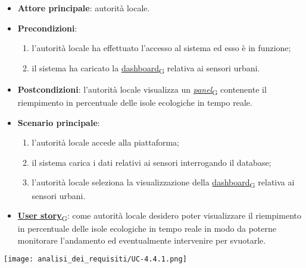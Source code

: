 \begin{itemize}
	\item \textbf{Attore principale}: autorità locale.
	\item \textbf{Precondizioni}:
	      \begin{enumerate}
		      \item l'autorità locale ha effettuato l'accesso al sistema ed esso è in funzione;
		      \item il sistema ha caricato la \href{https://7last.github.io/docs/pb/documentazione-interna/glossario\#dashboard}{dashboard\textsubscript{G}} relativa ai sensori urbani.
	      \end{enumerate}
	\item \textbf{Postcondizioni}: l'autorità locale visualizza un \href{https://7last.github.io/docs/pb/documentazione-interna/glossario\#panel}{\textit{panel}\textsubscript{G}} contenente il riempimento in percentuale delle isole ecologiche in tempo reale.
	\item \textbf{Scenario principale}:
	      \begin{enumerate}
		      \item l'autorità locale accede alla piattaforma;
		      \item il sistema carica i dati relativi ai sensori interrogando il database;
		      \item l'autorità locale seleziona la visualizzazione della \href{https://7last.github.io/docs/pb/documentazione-interna/glossario\#dashboard}{dashboard\textsubscript{G}} relativa ai sensori urbani.
	      \end{enumerate}
	\item \href{https://7last.github.io/docs/pb/documentazione-interna/glossario\#user-story}{\textbf{User story}\textsubscript{G}}:
	      come autorità locale desidero poter visualizzare il riempimento in percentuale delle isole ecologiche in tempo reale in modo da poterne monitorare l'andamento
	      ed eventualmente intervenire per svuotarle.
\end{itemize}
\begin{center}
	\texttt{[image: analisi\_dei\_requisiti/UC-4.4.1.png]}
\end{center}


